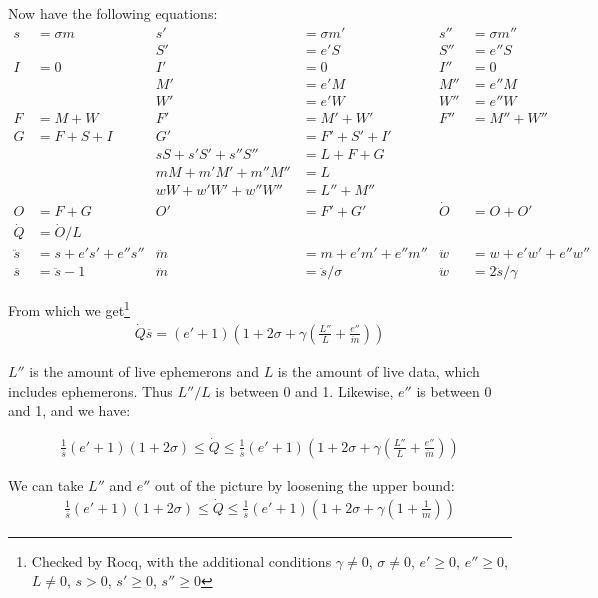 \documentclass{article}
\begin{document}
Now have the following equations:
\begin{align*}
s &= \sigma m  &  s' &= \sigma m'  &  s'' &= \sigma m'' \\
 & & S' &= e'S  &  S'' &= e''S \\
I &= 0  &  I' &= 0  &  I'' &= 0  \\
 & & M' &= e'M  &  M'' &= e''M \\
 & & W' &= e'W  &  W'' &= e''W \\
F &= M + W  &  F' &= M' + W'  &  F'' &= M'' + W'' \\
G &= F + S + I  &  G' &= F' + S' + I' \\
             &         & sS + s'S' + s''S'' &= L + F + G \\
             &         &  mM + m'M' + m''M'' &= L \\
             &         &  wW + w'W' + w''W'' &= L'' + M'' \\
O &= F + G  &  O' &= F' + G' & \dot{O} &= O + O' \\
\dot{Q} &= \dot{O}/L \\
\ddot{s} &= s + e's' + e''s'' & \ddot{m} &= m + e'm' + e''m'' &
   \ddot{w} &= w + e'w' + e''w'' \\
\overline{s} &= \ddot{s} - 1  &  \ddot{m} &= \ddot{s} / \sigma &
   \ddot{w} &= 2\ddot{s} / \gamma
\end{align*}

From which we get\footnote{
Checked by Rocq, with the additional conditions
$\gamma \neq 0$,
$\sigma \neq 0$,
$e' \geq 0$,
$e'' \geq 0$,
$L \neq 0$,
$s > 0$,
$s' \geq 0$,
$s'' \geq 0$
}
\begin{gather}
\dot{Q}\overline{s} = (e'+1) (1 + 2\sigma + \gamma(\frac{L''}{L} + \frac{e''}{\ddot{m}}))
\end{gather}

$L''$ is the amount of live ephemerons and $L$ is the amount of live
data, which includes ephemerons. Thus $L''/L$ is between 0 and 1.
Likewise, $e''$ is between 0 and 1, and we have:

\begin{gather}
\frac{1}{\overline{s}}(e'+1)(1 + 2\sigma) \leq \dot{Q} \leq
\frac{1}{\overline{s}}(e'+1)(1 + 2\sigma + \gamma(\frac{L''}{L} + \frac{e''}{\ddot{m}}))
\end{gather}

We can take $L''$ and $e''$ out of the picture by loosening the upper
bound:
\begin{gather}
\frac{1}{\overline{s}}(e'+1)(1 + 2\sigma) \leq \dot{Q} \leq
\frac{1}{\overline{s}}(e'+1)(1 + 2\sigma + \gamma(1 + \frac{1}{m}))
\end{gather}
\end{document}
